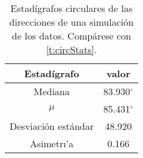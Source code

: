 \begin{table}[H]
	\centering
	\begin{tabular}{ |c|c|}
		\hline
		Estad\'igrafo         & valor  \\ \hline\hline
		Mediana             & 83.930$^{\circ}$  \\ \hline
		$\mu$              & 85.431$^{\circ}$ \\ \hline
		Desviaci\'on est\'andar & 48.920 \\ \hline
		Asimetr\i'a           & 0.166 \\ \hline
	\end{tabular}
	\caption{Estad\'igrafos circulares de las direcciones de una simulaci\'on de los datos. Comp\'arese con \autoref{t:circStats}.}
	\label{t:circStatsSim}
\end{table}

